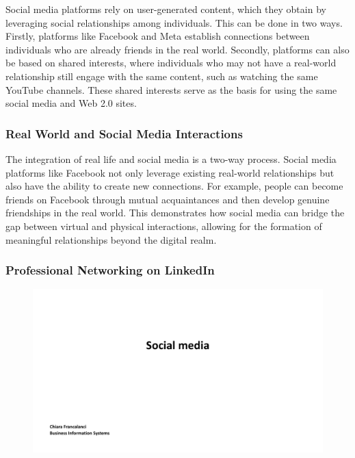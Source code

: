 Social media platforms rely on user-generated content, which they obtain
by leveraging social relationships among individuals. This can be done
in two ways. Firstly, platforms like Facebook and Meta establish
connections between individuals who are already friends in the real
world. Secondly, platforms can also be based on shared interests, where
individuals who may not have a real-world relationship still engage with
the same content, such as watching the same YouTube channels. These
shared interests serve as the basis for using the same social media and
Web 2.0 sites.

\subsubsection{Real World and Social Media
  Interactions}\label{real-world-and-social-media-interactions}

The integration of real life and social media is a two-way process.
Social media platforms like Facebook not only leverage existing
real-world relationships but also have the ability to create new
connections. For example, people can become friends on Facebook through
mutual acquaintances and then develop genuine friendships in the real
world. This demonstrates how social media can bridge the gap between
virtual and physical interactions, allowing for the formation of
meaningful relationships beyond the digital realm.

\subsubsection{Professional Networking on
  LinkedIn}\label{professional-networking-on-linkedin}

\begin{figure}[!h]
  \centering
  \includegraphics[page=3, trim = 1.5cm 4cm 3cm 4cm, clip, width=\imagewidth]{images/04 - Social_Media.pdf}
\end{figure}

